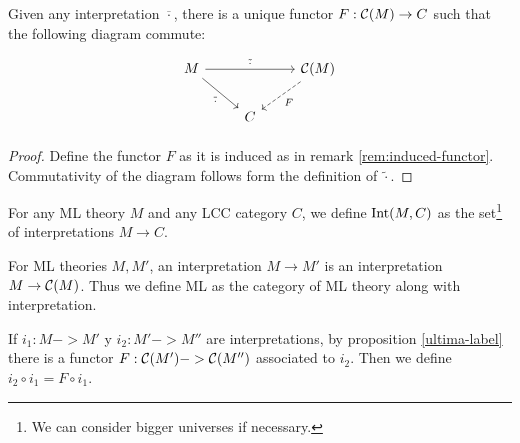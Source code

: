 \begin{definition}
\begin{proposition}\label{ultima-label}
  Given any interpretation $\overline \cdot$, there is a unique functor $F:\mathcal{C} (M) \to C$ such that the following diagram commute:
        \[
        \begin{tikzpicture}
          \node {\begin{tikzcd}
              M \ar[rr,"\tilde \cdot "]\ar[rd,swap, "\overline \cdot "] &  & \CC (M) \ar[ld, dashed, "F"] \\
              &   C &
            \end{tikzcd}};
        \end{tikzpicture}
      \]
\end{proposition}
\begin{proof}
Define the functor $F$ as it is induced as in remark \ref{rem:induced-functor}. Commutativity of the diagram follows form the definition of $\tilde \cdot$.
\end{proof}

\begin{definition}
For any ML theory $M$ and any LCC category $C$, we define $\operatorname{Int}(M,C)$ as the set\footnote{We can consider bigger universes if necessary.} of interpretations $M\to C$.
\end{definition}

\begin{definition}
  For ML theories $M,M'$,  an interpretation $M\to M'$ is an interpretation $M\to \mathcal{C} (M)$. Thus we define ML as the category of ML theory along with interpretation.
\end{definition}
\begin{remark}
  If $i_1: M -> M'$ y $i_2: M' -> M''$ are interpretations, by proposition \ref{ultima-label} there is a functor $F: \mathcal{C}(M') -> \mathcal{C}(M'')$ associated to $i_2$. Then we define $i_2 \circ i_1 = F \circ i_1$.
\end{remark}


\end{definition}
